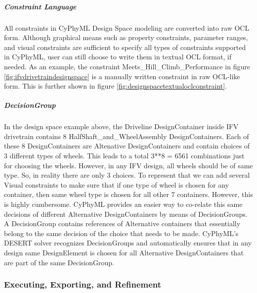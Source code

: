 \subparagraph{Constraint Language}
All constraints in CyPhyML Design Space modeling are converted into raw OCL form. Although graphical means such as property constraints, parameter ranges, and visual constraints are sufficient to specify all types of constraints supported in CyPhyML, user can still choose to write them in textual OCL format, if needed. As an example, the constraint Meets\_Hill\_Climb\_Performance in figure \ref{fig:ifvdrivetraindesignspace} is a manually written constraint in raw OCL-like form. This is further shown in figure \ref{fig:designspacetextualoclconstraint}.

\subparagraph{DecisionGroup}

In the design space example above, the Driveline DesignContainer inside IFV drivetrain contains 8 HalfShaft\_and\_WheelAssembly DesignContainers. Each of these 8 DesignContainers are Altenative DesignContainers and contain choices of 3 different types of wheels. This leads to a total 3**8 = 6561 combinations just for choosing the wheels. However, in any IFV design, all wheels should be of same type. So, in reality there are only 3 choices. To represent that we can add several Visual constraints to make sure that if one type of wheel is chosen for any container, then same wheel type is chosen for all other 7 containers. However, this is highly cumbersome. CyPhyML provides an easier way to co-relate this same decisions of different Alternative DesignContainers by means of DecisionGroups. A DecisionGroup contains references of Alternative containers that essentially belong to the same decision of the choice that needs to be made. CyPhyML's DESERT solver recognizes DecisionGroups and automatically ensures that in any design same DesignElement is chosen for all Alternative DesignContainers that are part of the same DecisionGroup.

\subsubsection{Executing, Exporting, and Refinement}

